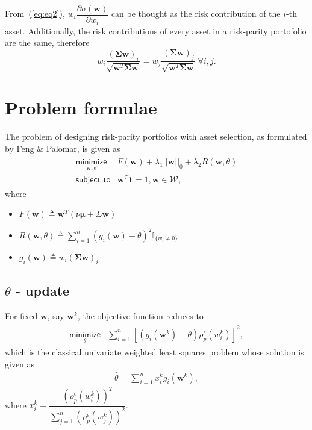 \documentclass{article}
\begin{document}
From~(\ref{eq:eq2}), $w_{i}\dfrac{\partial \sigma(\bm{w})}{\partial w_i}$ can be
thought as the risk contribution of the $i$-th asset. Additionally, the risk
contributions of every asset in a risk-parity portofolio are the same, therefore
\begin{equation}
w_i \dfrac{(\bm{\Sigma}{\bm{w}})_{i}}{\sqrt{\bm{w}^{T}\bm{\Sigma}\bm{w}}} =
w_j \dfrac{(\bm{\Sigma}{\bm{w}})_{j}}{\sqrt{\bm{w}^{T}\bm{\Sigma}\bm{w}}}~\forall i, j.
\end{equation}

\section{Problem formulae}
The problem of designing risk-parity portfolios with asset selection, as formulated by Feng \& Palomar,
is given as
\begin{align}\begin{array}{ll}
\underset{\bm{w}, \theta}{\textsf{minimize}} & F(\bm{w}) + \lambda_{1}||\bm{w}||_{0} + \lambda_{2}R(\bm{w}, \theta)\\
\textsf{subject to} & \bm{w}^{T}\bm{1} = 1, \bm{w} \in \mathcal{W},
\end{array}\end{align}
where
\begin{itemize}
    \item $F(\bm{w}) \triangleq \bm{w}^{T}(\nu \bm{\mu} + \Sigma\bm{w})$
    \item $R(\bm{w}, \theta) \triangleq \sum_{i=1}^{n}(g_i(\bm{w}) - \theta)^{2}\mathbb{I}_{\{w_i \neq 0\}}$
    \item $g_i(\bm{w}) \triangleq w_i\left(\bm{\Sigma}\bm{w}\right)_{i}$
\end{itemize}

\subsection{$\theta$ - update}
For fixed $\bm{w}$, say $\bm{w}^{k}$, the objective function reduces to
\begin{align}\begin{array}{ll}
\underset{\theta}{\textsf{minimize}} & \sum_{i=1}^{n}\left[\left(g_i(\bm{w}^{k}) -
                                       \theta\right)\rho^{\epsilon}_{p}\left(w^{k}_{i}\right)\right]^2,
\end{array}\end{align}
which is the classical univariate weighted least squares problem whose solution is given as
\begin{align}
\hat{\theta} = \sum_{i=1}^{n}x^{k}_{i}g_{i}\left(\bm{w}^{k}\right),
\end{align}
where $x^{k}_{i} = \dfrac{\left(\rho^{\epsilon}_p\left(w^{k}_i\right)\right)^{2}}
                  {\sum^{n}_{j = 1}\left(\rho^{\epsilon}_{p}\left(w^{k}_j\right)\right)^{2}}$.
\end{document}
